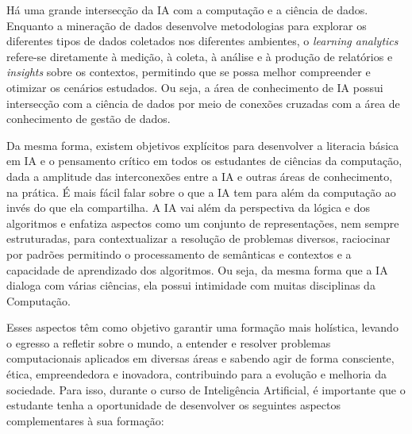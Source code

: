 Há uma grande intersecção da IA com a computação e a ciência de dados. Enquanto a mineração de dados desenvolve metodologias para explorar os diferentes tipos de dados coletados nos diferentes ambientes, o \textit{learning analytics} refere-se diretamente à medição, à coleta, à análise e à produção de relatórios e \textit{insights} sobre os contextos, permitindo que se possa melhor compreender e otimizar os cenários estudados. Ou seja, a área de conhecimento de IA possui intersecção com a ciência de dados por meio de conexões cruzadas com a área de conhecimento de gestão de dados.

Da mesma forma, existem objetivos explícitos para desenvolver a literacia básica em IA e o pensamento crítico em todos os estudantes de ciências da computação, dada a amplitude das interconexões entre a IA e outras áreas de conhecimento, na prática. É mais fácil falar sobre o que a IA tem para além da computação ao invés do que ela compartilha. A IA vai além da perspectiva da lógica e dos algoritmos e enfatiza aspectos como um conjunto de representações, nem sempre estruturadas, para contextualizar a resolução de problemas diversos, raciocinar por padrões permitindo o processamento de semânticas e contextos e a capacidade de aprendizado dos algoritmos.   Ou   seja,   da   mesma   forma   que   a   IA   dialoga   com   várias ciências, ela possui intimidade com muitas disciplinas da Computação.  

Esses aspectos têm como objetivo garantir uma formação mais holística, levando o egresso a refletir sobre o mundo, a entender e resolver problemas computacionais aplicados em diversas áreas e sabendo agir de forma consciente, ética, empreendedora e inovadora, contribuindo para a evolução e melhoria da sociedade. Para isso, durante o curso de Inteligência Artificial, é importante que o estudante tenha a oportunidade de desenvolver os seguintes aspectos complementares à sua formação:

